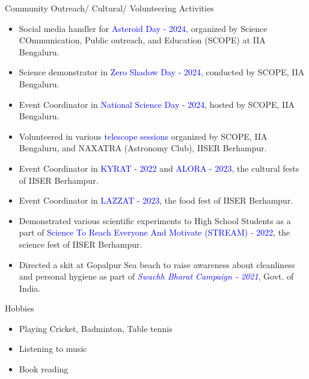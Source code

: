 \documentclass{resume} %
\begin{document}
\begin{rSection}{Community Outreach/ Cultural/ Volunteering Activities}
    \begin{itemize}
    \itemsep -3pt
        \item Social media handler for \textcolor{blue}{Asteroid Day - 2024}, organized by Science COmmunication, Public outreach, and Education (SCOPE) at IIA Bengaluru.
        \item Science demonstrator in \textcolor{blue}{Zero Shadow Day - 2024}, conducted by SCOPE, IIA Bengaluru.
        \item Event Coordinator in \textcolor{blue}{National Science Day - 2024}, hosted by SCOPE, IIA Bengaluru.
        \item Volunteered in various \textcolor{blue}{telescope sessions} organized by SCOPE, IIA Bengaluru, and NAXATRA (Astronomy Club), IISER Berhampur.
        \item Event Coordinator in \textcolor{blue}{KYRAT - 2022} and \textcolor{blue}{ALORA - 2023}, the cultural fests of IISER Berhampur.
        \item Event Coordinator in \textcolor{blue}{LAZZAT - 2023}, the food fest of IISER Berhampur.
        \item Demonstrated various scientific experiments to High School Students as a part of \textcolor{blue}{Science To Reach Everyone And Motivate (STREAM) - 2022}, the science fest of IISER Berhampur.
        \item Directed a skit at Gopalpur Sea beach to raise awareness about cleanliness and personal hygiene as part of \textcolor{blue}{\textit{Swachh Bharat Campaign - 2021}}, Govt. of India.
        
    \end{itemize}
\end{rSection}

\begin{rSection}{Hobbies}

\begin{itemize}
\itemsep -3pt
    \item Playing Cricket, Badminton, Table tennis
    \item Listening to music
    \item Book reading
\end{itemize}
    
\end{rSection}
\end{document}
